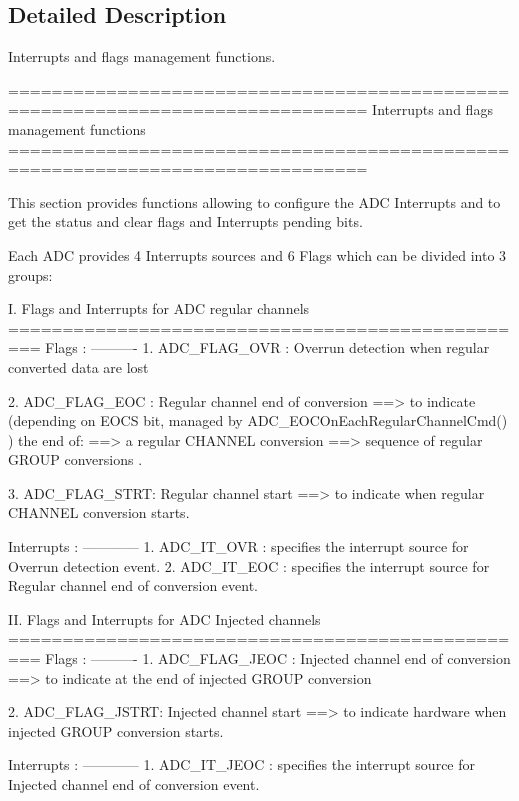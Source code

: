 \subsection{Detailed Description}
Interrupts and flags management functions. 

\begin{DoxyVerb} ===============================================================================
                   Interrupts and flags management functions
 ===============================================================================  

  This section provides functions allowing to configure the ADC Interrupts and 
  to get the status and clear flags and Interrupts pending bits.
  
  Each ADC provides 4 Interrupts sources and 6 Flags which can be divided into 
  3 groups:
  
  I. Flags and Interrupts for ADC regular channels
  =================================================
  Flags :
  ---------- 
     1. ADC_FLAG_OVR : Overrun detection when regular converted data are lost

     2. ADC_FLAG_EOC : Regular channel end of conversion ==> to indicate (depending 
              on EOCS bit, managed by ADC_EOCOnEachRegularChannelCmd() ) the end of:
               ==> a regular CHANNEL conversion 
               ==> sequence of regular GROUP conversions .

     3. ADC_FLAG_STRT: Regular channel start ==> to indicate when regular CHANNEL 
              conversion starts.

  Interrupts :
  ------------
     1. ADC_IT_OVR : specifies the interrupt source for Overrun detection event.  
     2. ADC_IT_EOC : specifies the interrupt source for Regular channel end of 
                     conversion event.
  
  
  II. Flags and Interrupts for ADC Injected channels
  =================================================
  Flags :
  ---------- 
     1. ADC_FLAG_JEOC : Injected channel end of conversion ==> to indicate at 
               the end of injected GROUP conversion  
              
     2. ADC_FLAG_JSTRT: Injected channel start ==> to indicate hardware when 
               injected GROUP conversion starts.

  Interrupts :
  ------------
     1. ADC_IT_JEOC : specifies the interrupt source for Injected channel end of 
                      conversion event.     


\end{DoxyVerb}
